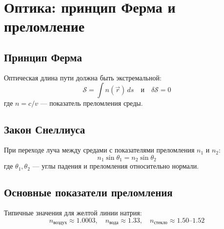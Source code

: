 \documentclass{article}
\begin{document}
\section*{Оптика: принцип Ферма и преломление}

\subsection*{Принцип Ферма}
Оптическая длина пути должна быть экстремальной:
\[
\mathcal S=\int n(\vec r)\,ds \quad \text{и} \quad \delta\mathcal S=0
\]
где $n=c/v$ — показатель преломления среды.

\subsection*{Закон Снеллиуса}
При переходе луча между средами с показателями преломления $n_1$ и $n_2$:
\[
n_1\sin\theta_1 = n_2\sin\theta_2
\]
где $\theta_1,\theta_2$ — углы падения и преломления относительно нормали.

\subsection*{Основные показатели преломления}
Типичные значения для желтой линии натрия:
\[
n_{\text{воздух}}\approx1.0003,\quad
n_{\text{вода}}\approx1.33,\quad
n_{\text{стекло}}\approx1.50\text{–}1.52
\]
\end{document}
